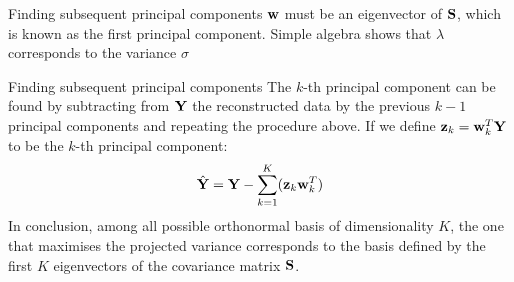 \documentclass[aspectratio=169,notes]{beamer}
\begin{document}
	\begin{frame}{Finding subsequent principal components}
	${\bf w}$ must be an eigenvector of ${\bf S}$, which is known as the first principal component. Simple algebra shows that $\lambda$ corresponds to the variance $\sigma$
	\end{frame}

	\begin{frame}{Finding subsequent principal components}
	The $k$-th principal component can be found by subtracting from ${\bf Y}$ the reconstructed data by the previous $k-1$ principal components and repeating the procedure above. If we define ${\bf z}_k={\bf w}_k^T {\bf Y}$ to be the $k$-th principal component:
	\begin{equation}
		\hat{{\bf Y}} = {\bf Y} - \sum_{k=1}^{K} ({\bf z}_k {\bf w}_k^T)
	\end{equation}
	In conclusion, among all possible orthonormal basis of dimensionality $K$, the one that maximises the projected variance corresponds to the basis defined by the first $K$ eigenvectors of the covariance matrix ${\bf S}$.

	



	\end{frame}



\end{document}
